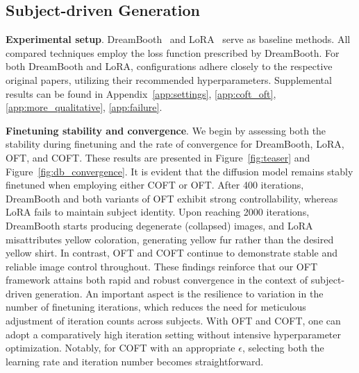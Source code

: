\subsection{Subject-driven Generation}

\textbf{Experimental setup}. DreamBooth~\cite{ruiz2023dreambooth} and LoRA~\cite{hulora2022} serve as baseline methods. All compared techniques employ the loss function prescribed by DreamBooth. For both DreamBooth and LoRA, configurations adhere closely to the respective original papers, utilizing their recommended hyperparameters. Supplemental results can be found in Appendix~\ref{app:settings}, \ref{app:coft_oft}, \ref{app:more_qualitative}, \ref{app:failure}.

\textbf{Finetuning stability and convergence}. We begin by assessing both the stability during finetuning and the rate of convergence for DreamBooth, LoRA, OFT, and COFT. These results are presented in Figure~\ref{fig:teaser} and Figure~\ref{fig:db_convergence}. It is evident that the diffusion model remains stably finetuned when employing either COFT or OFT. After 400 iterations, DreamBooth and both variants of OFT exhibit strong controllability, whereas LoRA fails to maintain subject identity. Upon reaching 2000 iterations, DreamBooth starts producing degenerate (collapsed) images, and LoRA misattributes yellow coloration, generating yellow fur rather than the desired yellow shirt. In contrast, OFT and COFT continue to demonstrate stable and reliable image control throughout. These findings reinforce that our OFT framework attains both rapid and robust convergence in the context of subject-driven generation. An important aspect is the resilience to variation in the number of finetuning iterations, which reduces the need for meticulous adjustment of iteration counts across subjects. With OFT and COFT, one can adopt a comparatively high iteration setting without intensive hyperparameter optimization. Notably, for COFT with an appropriate $\epsilon$, selecting both the learning rate and iteration number becomes straightforward.

